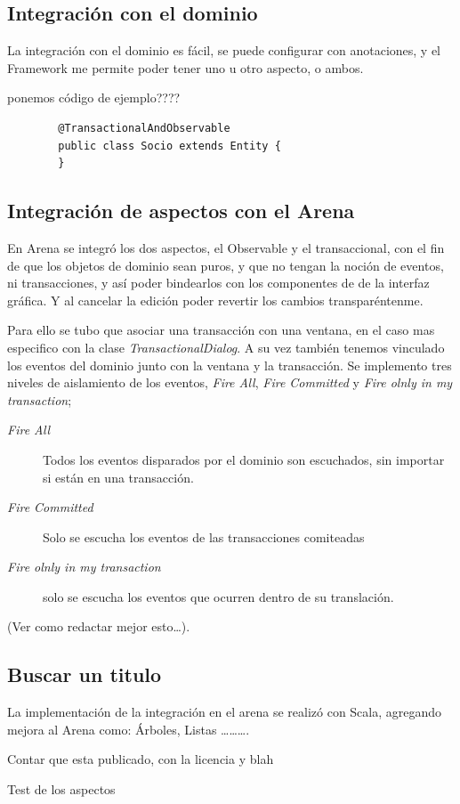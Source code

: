\subsection{Integración con el dominio } 
	La integración con el dominio es fácil, se puede configurar con
	anotaciones, y el Framework me permite poder tener uno u otro aspecto, o
	ambos.
	
	{ponemos código de ejemplo????}
	
	\begin{lstlisting} 
		@TransactionalAndObservable
		public class Socio extends Entity {
		}
	\end{lstlisting}
	
	
	
\subsection{Integración de aspectos con el Arena}
En Arena se integró los dos aspectos, el Observable y el transaccional, con el
fin de que los objetos de dominio sean puros, y que no tengan la noción de
eventos, ni transacciones, y así poder bindearlos con los componentes de de la
interfaz gráfica. Y al cancelar la edición poder revertir los cambios
transparéntenme.

Para ello se tubo que asociar una transacción con una ventana, en el caso mas
especifico con la clase \emph{TransactionalDialog}. A su vez también tenemos
vinculado los eventos del dominio junto con la ventana y la transacción.
Se implemento tres niveles de aislamiento de los eventos,  \emph{Fire All},
\emph{Fire Committed} y \emph{Fire olnly in my transaction};

\begin{description}
	\item[\emph{Fire All}] Todos los eventos disparados por el dominio son
	escuchados, sin importar si están en una transacción.

	\item[\emph{Fire Committed}] Solo se escucha los eventos de las transacciones
		comiteadas
	
	\item[\emph{Fire olnly in my transaction}] solo se escucha los eventos que
		ocurren dentro de su translación.

 \end{description}
(Ver como redactar mejor esto\ldots ).

	
\subsection{Buscar un  titulo}
La implementación de la integración en el arena se realizó con Scala, agregando
mejora al Arena como: Árboles, Listas \ldots \ldots \ldots. 
	
	
Contar que esta publicado, con la licencia y blah

Test de los aspectos


